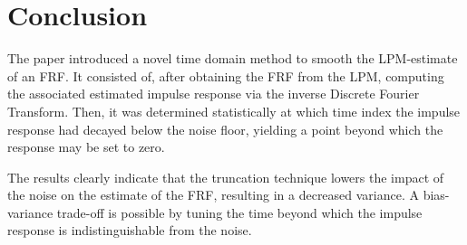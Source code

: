 \section{Conclusion}\label{se:conclusion}

The paper introduced a novel time domain method to smooth the LPM-estimate of an FRF. It consisted of, after obtaining the FRF from the LPM, computing the associated estimated impulse response via the inverse Discrete Fourier Transform. Then, it was determined statistically at which time index the impulse response had decayed below the noise floor, yielding a point beyond which the response may be set to zero.

The results clearly indicate that the truncation technique lowers the impact of the noise on the estimate of the FRF, resulting in a decreased variance. A bias-variance trade-off is possible by tuning the time beyond which the impulse response is indistinguishable from the noise. %